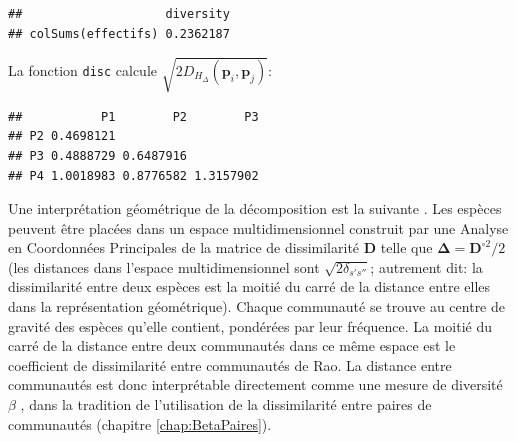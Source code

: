 \documentclass[
  11pt,
  french,
  a4paper,
  extrafontsizes,onecolumn,openright
  ]{memoir}
\newenvironment{Shaded}{\begin{snugshade}}{\end{snugshade}}
\newcommand{\KeywordTok}[1]{\textcolor[rgb]{0.13,0.29,0.53}{\textbf{#1}}}
\newcommand{\NormalTok}[1]{#1}
\newcommand{\OperatorTok}[1]{\textcolor[rgb]{0.81,0.36,0.00}{\textbf{#1}}}
\begin{document}
\scriptsize

\begin{Shaded}
\end{Shaded}

\begin{verbatim}
##                    diversity
## colSums(effectifs) 0.2362187
\end{verbatim}

\normalsize

La fonction \texttt{disc} calcule \(\sqrt{2D_{H_{\Delta}}\left({\mathbf{p}}_i,{\mathbf{p}}_j\right)}\):

\scriptsize

\begin{Shaded}
\end{Shaded}

\begin{verbatim}
##           P1        P2        P3
## P2 0.4698121                    
## P3 0.4888729 0.6487916          
## P4 1.0018983 0.8776582 1.3157902
\end{verbatim}

\normalsize

Une interprétation géométrique de la décomposition est la suivante \autocite{Pavoine2004}.
Les espèces peuvent être placées dans un espace multidimensionnel construit par une Analyse en Coordonnées Principales \autocite{Gower1966} de la matrice de dissimilarité \(\mathbf{D}\) telle que \(\mathbf{\Delta}={\mathbf{D}^{\circ2}}/{2}\) (les distances dans l'espace multidimensionnel sont \(\sqrt{2\delta_{s's''}}\); autrement dit: la dissimilarité entre deux espèces est la moitié du carré de la distance entre elles dans la représentation géométrique).
Chaque communauté se trouve au centre de gravité des espèces qu'elle contient, pondérées par leur fréquence.
La moitié du carré de la distance entre deux communautés dans ce même espace est le coefficient de dissimilarité entre communautés de Rao.
La distance entre communautés est donc interprétable directement comme une mesure de diversité \(\beta\) \autocite{Ricotta2015}, dans la tradition de l'utilisation de la dissimilarité entre paires de communautés (chapitre \ref{chap:BetaPaires}).
\end{document}
